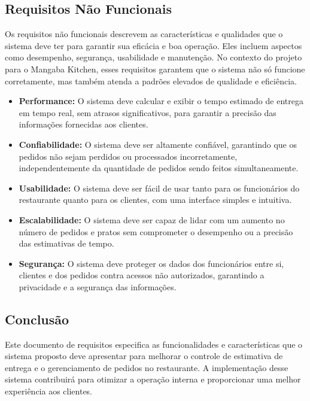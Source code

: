 \subsection{Requisitos Não Funcionais}
Os requisitos não funcionais descrevem as características e qualidades que o sistema deve ter para garantir sua eficácia e boa operação. Eles incluem aspectos como desempenho, segurança, usabilidade e manutenção. No contexto do projeto para o Mangaba Kitchen, esses requisitos garantem que o sistema não só funcione corretamente, mas também atenda a padrões elevados de qualidade e eficiência.

\begin{itemize}
    \item \textbf{Performance:} O sistema deve calcular e exibir o tempo estimado de entrega em tempo real, sem atrasos significativos, para garantir a precisão das informações fornecidas aos clientes.
    
    \item \textbf{Confiabilidade:} O sistema deve ser altamente confiável, garantindo que os pedidos não sejam perdidos ou processados incorretamente, independentemente da quantidade de pedidos sendo feitos simultaneamente.
    
    \item \textbf{Usabilidade:} O sistema deve ser fácil de usar tanto para os funcionários do restaurante quanto para os clientes, com uma interface simples e intuitiva.
    
    \item \textbf{Escalabilidade:} O sistema deve ser capaz de lidar com um aumento no número de pedidos e pratos sem comprometer o desempenho ou a precisão das estimativas de tempo.
    
    \item \textbf{Segurança:} O sistema deve proteger os dados dos funcionários entre si, clientes e dos pedidos contra acessos não autorizados, garantindo a privacidade e a segurança das informações.
\end{itemize}

\subsection{Conclusão}
Este documento de requisitos especifica as funcionalidades e características que o sistema proposto deve apresentar para melhorar o controle de estimativa de entrega e o gerenciamento de pedidos no restaurante. A implementação desse sistema contribuirá para otimizar a operação interna e proporcionar uma melhor experiência aos clientes.